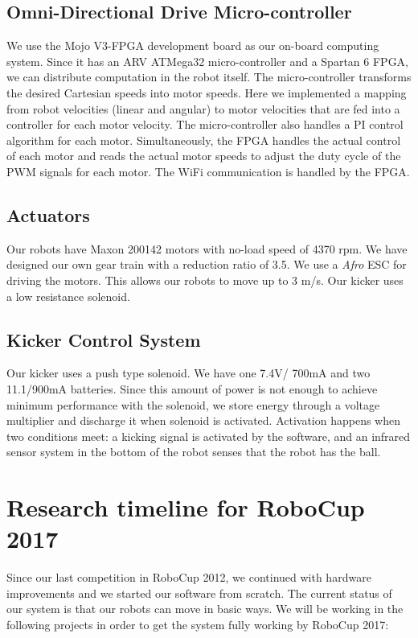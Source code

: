 \documentclass[]{llncs}
\begin{document}
\subsection{Omni-Directional Drive Micro-controller}
We use the Mojo V3-FPGA development board as our on-board computing system. Since it has an ARV ATMega32 micro-controller and a Spartan 6 FPGA, we can distribute computation in the robot itself. The micro-controller transforms the desired Cartesian speeds into motor speeds. Here we implemented a mapping from robot velocities (linear and angular) to motor velocities that are fed into a controller for each motor velocity. The micro-controller also handles a PI control algorithm for each motor. Simultaneously, the FPGA handles the actual control of each motor and reads the actual motor speeds to adjust the duty cycle of the PWM signals for each motor. The WiFi communication is handled by the FPGA. 


\subsection{Actuators}
Our robots have Maxon 200142 motors with no-load speed of 4370 rpm. We have designed our own gear train with a reduction ratio of 3.5. We use a \textit{Afro} ESC for driving the motors. This allows our robots to move up to 3 m/s. Our kicker uses a low resistance solenoid.



\subsection{Kicker Control System}
Our kicker uses a push type solenoid. We have one 7.4V/ 700mA and two 11.1/900mA batteries. Since this amount of power is not enough to achieve minimum performance with the solenoid, we store energy through a voltage multiplier and discharge it when solenoid is activated. Activation happens when two conditions meet: a kicking signal is activated by the software, and an infrared sensor system in the bottom of the robot senses that the robot has the ball. 

\section{Research timeline for RoboCup 2017}
Since our last competition in RoboCup 2012, we continued with hardware improvements and we started our software from scratch. The current status of our system is that our robots can move in basic ways. We will be working in the following projects in order to get the system fully working by RoboCup 2017:
\end{document}
